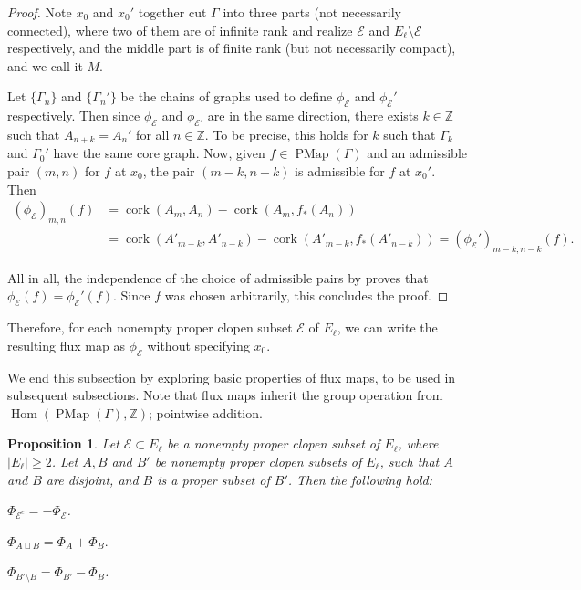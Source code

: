 \documentclass[11pt]{amsart}
\theoremstyle{plain}
\newtheorem{PROP}[THM]{Proposition}
\theoremstyle{definition}
\DeclareMathOperator{\Hom}{Hom}
\DeclareMathOperator{\PMap}{PMap}
\DeclareMathOperator{\cork}{cork}
\newcommand{\Z}{\mathbb{Z}}
\newcommand{\cE}{\mathcal{E}}
\def\G{{\Gamma}}
\newcommand{\<}{\langle}
\renewcommand{\>}{\rangle}
\begin{document}
\begin{proof}
    Note $x_0$ and $x_0'$ together cut $\G$ into three parts (not necessarily connected), where two of them are of infinite rank and realize $\cE$ and $E_\ell \setminus \cE$ respectively, and the middle part is of finite rank (but not necessarily compact), and we call it $M$. 
    
    Let $\{\G_n\}$ and $\{\G_n'\}$ be the chains of graphs used to define $\phi_\cE$ and $\phi_{\cE}'$ respectively. Then since $\phi_\cE$ and $\phi_{\cE'}$ are in the same direction, there exists $k \in \Z$ such that $A_{n+k} = A_{n}'$ for all $n \in \Z$. To be precise, this holds for $k$ such that $\G_{k}$ and $\G_{0}'$ have the same core graph. Now, given $f \in \PMap(\G)$ and an admissible pair $(m,n)$ for $f$ at $x_{0}$, the pair $(m-k,n-k)$ is admissible for $f$ at $x_{0}'$. Then\
    \begin{align*}
    (\phi_{\cE})_{m,n}(f) &= \cork(A_m,A_n) - \cork(A_m,f_*(A_n))\\
    &= \cork(A'_{m-k},A'_{n-k}) - \cork(A'_{m-k}, f_*(A'_{n-k}))
    =(\phi_{\cE}')_{m-k,n-k}(f).
    \end{align*}
    
    All in all, the independence of the choice of admissible pairs by  proves that $\phi_{{\cE}}(f) = \phi_{{\cE}}'(f)$. Since $f$ was chosen arbitrarily, this concludes the proof.
\end{proof}

Therefore, for each nonempty proper clopen subset $\cE$ of $E_\ell$, we can write the resulting flux map as $\phi_{\cE}$ without specifying $x_0$.

We end this subsection by exploring basic properties of flux maps, to be used in subsequent subsections. Note that flux maps inherit the group operation from $\Hom(\PMap(\G),\Z)$; pointwise addition.

\begin{PROP} \label{prop:fluxProperties}
    Let $\cE \subset E_\ell$ be a nonempty proper clopen subset of $E_\ell$, where $|E_\ell| \ge 2$. Let $A,B$ and $B'$ be nonempty proper clopen subsets of $E_\ell$, such that $A$ and $B$ are disjoint, and $B$ is a proper subset of $B'$. Then the following hold:
    \begin{PROPenum}
        \item \label{prop:fluxcomplement} $\Phi_{\cE^c} = -\Phi_\cE$.
        \item \label{prop:flux_disjoint_sets} $\Phi_{A \sqcup B} = \Phi_A + \Phi_B.$
        \item \label{prop:fluxdifference} $\Phi_{B' \setminus B} = \Phi_{B'} - \Phi_{B}$.
    \end{PROPenum}
\end{PROP}
\end{document}
